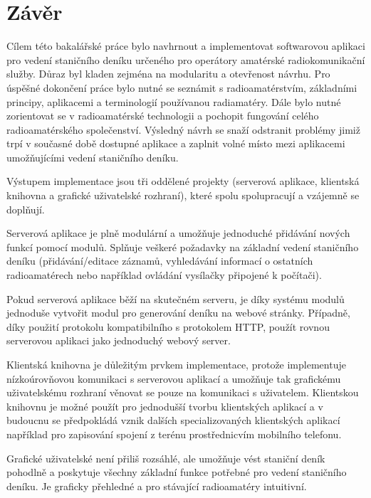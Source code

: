 \chapter{Závěr}
Cílem této bakalářské práce bylo navhrnout a implementovat softwarovou aplikaci
pro vedení staničního deníku určeného pro operátory amatérské radiokomunikační služby. Důraz byl kladen zejména
na modularitu a otevřenost návrhu. Pro úspěšné dokončení práce bylo nutné se seznámit s radioamatérstvím,
základními principy, aplikacemi a terminologií používanou radiamatéry.
Dále bylo nutné zorientovat se v 
radioamatérské technologii a pochopit fungování celého radioamatérského společenství.
Výsledný návrh se snaží odstranit problémy jimiž trpí v současné době dostupné
aplikace a zaplnit volné místo mezi aplikacemi umožňujícími vedení staničního deníku.

Výstupem implementace jsou tři oddělené projekty (serverová aplikace, klientská knihovna a grafické uživatelské rozhraní),
které spolu spolupracují a vzájemně se doplňují.

Serverová aplikace je plně modulární a umožňuje jednoduché přidávání nových
funkcí pomocí modulů. Splňuje veškeré požadavky na základní vedení staničního deníku (přidávání/editace záznamů, vyhledávání 
informací o ostatních radioamatérech nebo například ovládání vysílačky připojené k počítači).

Pokud serverová aplikace běží na skutečném serveru, je díky systému modulů jednoduše vytvořit modul
pro generování deníku na webové stránky. Případně, díky použití protokolu kompatibilního s protokolem HTTP, použít rovnou
serverovou aplikaci jako jednoduchý webový server.

Klientská knihovna je důležitým prvkem implementace, protože implementuje nízkoúrovňovou komunikaci s serverovou aplikací
a umožňuje tak grafickému uživatelskému rozhraní věnovat se pouze na komunikaci s uživatelem. Klientskou knihovnu
je možné použít pro jednodušší tvorbu klientských aplikací a v budoucnu se předpokládá vznik dalších specializovaných
klientských aplikací například pro zapisování spojení z terénu prostřednicvím mobilního telefonu.

Grafické uživatelské není přiliš rozsáhlé, ale umožňuje vést staniční deník pohodlně a poskytuje všechny základní funkce potřebné
pro vedení staničního deníku. Je graficky přehledné a pro stávající radioamatéry intuitivní.

